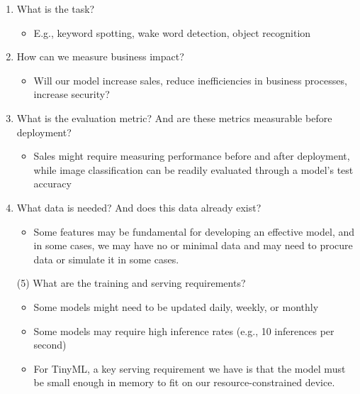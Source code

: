     \begin{enumerate}
        \item What is the task?
          \begin{itemize}
              \item E.g., keyword spotting, wake word detection, object recognition
          \end{itemize}
      \item  How can we measure business impact?
    
          \begin{itemize}
           \item Will our model increase sales, reduce inefficiencies in business processes, increase security?
          \end{itemize}
    \item  What is the evaluation metric? And are these metrics measurable before deployment?
          \begin{itemize}
             \item Sales might require measuring performance before and after deployment, while image classification can be readily evaluated through a model’s test accuracy
          \end{itemize}
    \item  What data is needed? And does this data already exist?
          \begin{itemize}
    
             \item  Some features may be fundamental for developing an effective model, and in some cases, we may have no or minimal data and may need to procure data or simulate it in some cases.
          \end{itemize}
    (5)  What are the training and serving requirements?

          \begin{itemize}
    
             \item Some models might need to be updated daily, weekly, or monthly
             \item Some models may require high inference rates (e.g., 10 inferences per second)
             \item For TinyML, a key serving requirement we have is that the model must be small enough in memory to fit on our resource-constrained device.
          \end{itemize}

    \end{enumerate}

